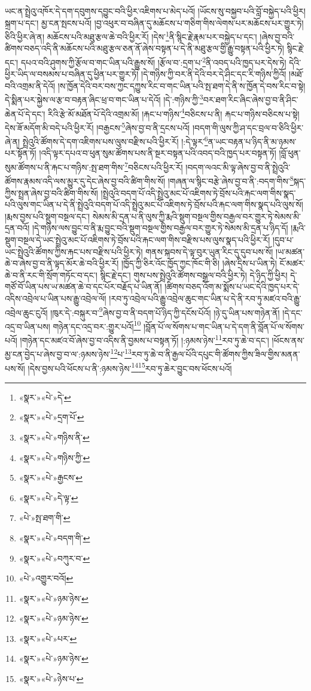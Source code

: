 ཡང་ན་སྤྲེའུ་འཁོར་དེ་དག་དབུགས་དབྱུང་བའི་ཕྱིར་འཇིགས་པ་མེད་པའོ། །ཡོངས་སུ་བསྐྱབ་པའི་བློ་བསྐྱེད་པའི་ཕྱིར། སྐྲག་པ་དང་། མྱ་ངན་སྤངས་པའོ། །བྱ་འཕུར་བ་བཞིན་དུ་མཆོངས་པ་གཅིག་གིས་ལེགས་པར་མཆོངས་པར་གྱུར་ཏེ། ཅིའི་ཕྱིར་ཞེ་ན། མཆོངས་པའི་མཐུ་རྩལ་ཆེ་བའི་ཕྱིར་རོ། །དེས་\footnote{«སྣར་»«པེ་»དེ་}ནི་སྙིང་རྗེ་རྣམ་པར་བསྐྱེད་པ་དང་། །ཞེས་བྱ་བའི་ཚིགས་བཅད་འདི་ནི་མཆོངས་པའི་མཐུ་རྩལ་ཅན་ནོ་ཞེས་བསྟན་པ་དེ་ནི་མཐུ་རྩལ་གྱི་རྒྱུ་བསྟན་པའི་ཕྱིར་ཏེ། སྙིང་རྗེ་དང་། དཔའ་བའི་ཤུགས་ཀྱི་རྩོལ་བ་གང་ཡིན་པའི་རྒྱུས་སོ། །རྩོལ་བ་:དྲག་པ་\footnote{«སྣར་»«པེ་»དྲག་པོ་}ནི་འབད་པའི་ཁྱད་པར་དེས་ཏེ། དེའི་ཕྱིར་ཡིད་ལ་བསམས་པ་བཞིན་དུ་ཕྱིན་པར་གྱུར་ཏོ། །དེ་གཉིས་ཀྱི་བར་ནི་དེའི་བར་དེ་ཤིང་དང་རི་གཉིས་ཀྱིའོ། །མཐོ་བའི་འགྲམ་ནི་དེའོ། །ས་ཁྱོན་དེའི་བར་བས་ཀྱང་དཀྱུས་རིང་བ་གང་ཡིན་པའི་སྤ་ཐག་དེ་ནི་ས་ཁྱོན་དེ་བས་རིང་བ་སྟེ། དེ་སྨིན་པར་སྐྱེས་ལ་རྩ་བ་བརྟན་ཞིང་ཕྲ་བ་གང་ཡིན་པ་དེའོ། །དེ་:གཉིས་ཀྱི་\footnote{«སྣར་»«པེ་»གཉིས་ནི་}བར་ཐག་རིང་ཞིང་ཞེས་བྱ་བ་ནི་ཤིང་ཆེན་པོ་དེ་དང་། རིའི་རྩེ་མོ་མཐོན་པོ་དེའི་འགྲམ་མོ། །རྐང་པ་གཉིས་\footnote{«སྣར་»«པེ་»གཉིས་ཀྱི་}བཅིངས་པ་ནི། རྐང་པ་གཉིས་བཅིངས་པ་སྟེ། དེས་ཟོ་མདོག་མི་བདེ་པའི་ཕྱིར་རོ། །བརྒྱངས་\footnote{«སྣར་»«པེ་»རྒྱངས་}ཞེས་བྱ་བ་ནི་དྲངས་པའོ། །བདག་གི་ལུས་ཀྱི་ཤ་དང་བྲལ་བ་ཅིའི་ཕྱིར་ཞེ་ན། སྤྲེའུའི་ཚོགས་དེ་དག་འཇིགས་པས་ལུས་བརྫིས་པའི་ཕྱིར་རོ། །:དེ་ལྟར་\footnote{«སྣར་»«པེ་»དེ་ལྟ་}ན་ཡང་བརྟན་པ་ཉིད་ནི་མ་ཉམས་པར་སྟོན་ཏོ། །འདི་ལྟར་དཔའ་བ་ཕུན་སུམ་ཚོགས་པས་ནི་སྔར་བསྟན་པའི་འབད་བའི་ཁྱད་པར་བསྟན་ཏོ། །བློ་ཕུན་སུམ་ཚོགས་པ་ནི་རྐང་པ་གཉིས་:སྤ་ཐག་གིས་\footnote{«པེ་»སྤ་ཐག་གི་}བཅིངས་པའི་ཕྱིར་རོ། །བདག་ལའང་མི་ལྟ་ཞེས་བྱ་བ་ནི་སྤྲེའུའི་ཚོགས་རྣམས་འདི་ལས་མྱུར་དུ་དེང་ཞེས་བྱ་བའི་ཚིག་གིས་སོ། །གཞན་ལ་སྙིང་བརྩེ་ཞེས་བྱ་བ་ནི་:བདག་གིས་\footnote{«སྣར་»«པེ་»བདག་གི་}སྐད་ཀྱིས་སྤྲན་ཞེས་བྱ་བའི་ཚིག་གིས་སོ། །སྤྲེའུའི་བདག་པོ་འདི་སྤྲེའུ་མང་པོ་འཇིགས་ཏེ་བྲོས་པའི་རྐང་ལག་གིས་སྣད་པའི་ལུས་གང་ཡིན་པ་དེ་ནི་སྤྲེའུའི་བདག་པོ་འདི་སྤྲེའུ་མང་པོ་འཇིགས་ཏེ་བྲོས་པའི་རྐང་ལག་གིས་སྣད་པའི་ལུས་སོ། །རྨས་བྱས་པའི་སྡུག་བསྔལ་དང་། སེམས་མི་དྲན་པ་ནི་ལུས་ཀྱི་རྨའི་སྡུག་བསྔལ་གྱིས་བརྒྱལ་བར་གྱུར་ཏེ་སེམས་མི་དྲན་བའོ། །དེ་གཉིས་ལས་བྱུང་བ་ནི་རྨ་བྱུང་བའི་སྡུག་བསྔལ་གྱིས་བརྒྱལ་བར་གྱུར་ཏེ་སེམས་མི་དྲན་པ་ཉིད་དོ། །རྨའི་སྡུག་བསྔལ་དེ་ཡང་སྤྲེའུ་མང་པོ་འཇིགས་ཏེ་བྲོས་པའི་རྐང་ལག་གིས་བརྫིས་པས་ལུས་སྣད་པའི་ཕྱིར་རོ། །དུབ་པ་ཡང་སྤྲེའུའི་ཚོགས་ཀྱིས་རྐང་པས་བརྫིས་པའི་ཕྱིར་ཏེ། གནས་སྐབས་དེ་ལྟ་བུར་ཡུན་རིང་དུ་དུབ་པས་སོ། །ཡ་མཚན་ཆེ་བ་ཞེས་བྱ་བ་ནི་ལྟད་མོར་ཆེ་བའི་ཕྱིར་རོ། །ཁྱོད་ཀྱི་ཅིར་འོང་ཁྱོད་ཀྱང་ཁོང་གི་ཅི། །ཞེས་དྲིས་པ་ཡིན་ཏེ། ངོ་མཚར་ཆེ་བ་ནི་རང་གི་སྲོག་གཏོང་བ་དང་། སྙིང་རྗེ་དང་། གུས་པས་སྤྲེའུའི་ཚོགས་བསྒྲལ་བའི་ཕྱིར་ཏེ། དེ་ཉིད་ཀྱི་ཕྱིར། དེ་གཙོ་བོ་ཡིན་པས་ཡ་མཚན་ཆེ་བ་དང་པོར་བརྗོད་པ་ཡིན་ནོ། །ཚིགས་བཅད་འོག་མ་སྨོས་པ་ཡང་དེའི་ཁྱད་པར་དེ་འདིས་འབྲེལ་པ་ཡིན་པས་རྒྱུ་འབྲེལ་ལོ། །རབ་ཏུ་འབྲེལ་པའི་རྒྱུ་འབྲེལ་ཆུང་གང་ཡིན་པ་དེ་ནི་རབ་ཏུ་མཛའ་བའི་རྒྱུ་འབྲེལ་ཆུང་ངུའོ། །ཁུར་དེ་:བསྐུར་བ་\footnote{«སྣར་»«པེ་»བཀུར་བ་}ཞེས་བྱ་བ་ནི་བདག་པོ་ཉིད་ཀྱི་དངོས་པོའོ། །ཉེ་དུ་ཡིན་པས་གཉེན་ནོ། །དེ་དང་འདྲ་བ་ཡིན་པས། གཉེན་དང་འདྲ་བར་:གྱུར་པའོ།\footnote{«པེ་»འགྱུར་བའོ།} །བློན་པོ་ལ་སོགས་པ་གང་ཡིན་པ་དེ་དག་ནི་བློན་པོ་ལ་སོགས་པའོ། །གཉེན་དང་མཛའ་བོ་ཞེས་བྱ་བ་འདིས་ནི་བྱམས་པ་བསྟན་ཏོ། །:ཉམས་ཉེས་\footnote{«སྣར་»«པེ་»ཉམ་ཉེས་}རབ་ཏུ་ཆེ་བ་དང་། །ཕོངས་ནས་མྱ་ངན་བྱེད་པ་ཞེས་བྱ་བ་ལ་:ཉམས་ཉེས་\footnote{«སྣར་»«པེ་»ཉམ་ཉེས་}པ་\footnote{«སྣར་»«པེ་»པར་}རབ་ཏུ་ཆེ་བ་ནི་རྒྱལ་པོའི་དཔུང་གི་ཚོགས་ཀྱིས་ཟིལ་གྱིས་མནན་པས་སོ། །དེས་བྱས་པའི་ཕོངས་པ་ནི་:ཉམས་ཉེས་\footnote{«སྣར་»«པེ་»ཉམ་ཉེས་}\footnote{«སྣར་»«པེ་»ཉེས་པ་}རབ་ཏུ་ཆེར་བྱུང་བས་ཕོངས་པའོ། 